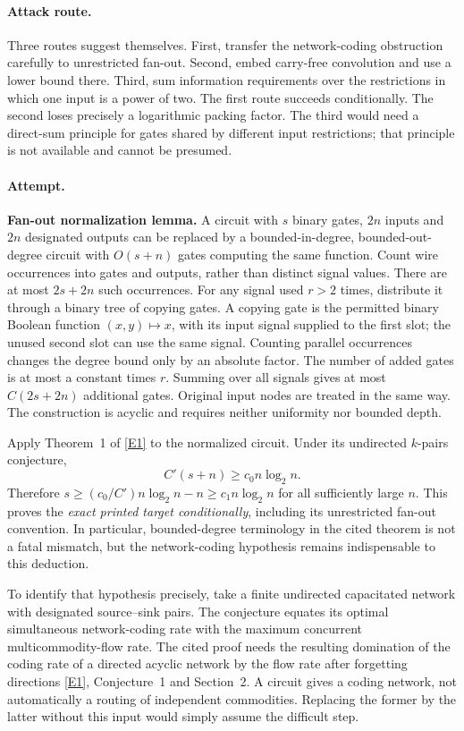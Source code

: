 \documentclass[11pt,a4paper]{article}
\newcommand{\eref}[2]{\hyperlink{extra:#1:#2}{[E#2]}}
\numberwithin{equation}{section}
\begin{document}
\paragraph{Attack route.}
Three routes suggest themselves. First, transfer the network-coding obstruction carefully to unrestricted fan-out. Second, embed carry-free convolution and use a lower bound there. Third, sum information requirements over the restrictions in which one input is a power of two. The first route succeeds conditionally. The second loses precisely a logarithmic packing factor. The third would need a direct-sum principle for gates shared by different input restrictions; that principle is not available and cannot be presumed.

\paragraph{Attempt.}
\textbf{Fan-out normalization lemma.} A circuit with $s$ binary gates, $2n$ inputs and $2n$ designated outputs can be replaced by a bounded-in-degree, bounded-out-degree circuit with $O(s+n)$ gates computing the same function.
Count wire occurrences into gates and outputs, rather than distinct signal values. There are at most $2s+2n$ such occurrences. For any signal used $r>2$ times, distribute it through a binary tree of copying gates. A copying gate is the permitted binary Boolean function $(x,y)\mapsto x$, with its input signal supplied to the first slot; the unused second slot can use the same signal. Counting parallel occurrences changes the degree bound only by an absolute factor. The number of added gates is at most a constant times $r$. Summing over all signals gives at most $C(2s+2n)$ additional gates. Original input nodes are treated in the same way. The construction is acyclic and requires neither uniformity nor bounded depth.

Apply Theorem~1 of \eref{statement}{1} to the normalized circuit. Under its undirected $k$-pairs conjecture,
\[
 C'(s+n)\ge c_0 n\log_2n.
\]
Therefore $s\ge(c_0/C')n\log_2n-n\ge c_1n\log_2n$ for all sufficiently large $n$. This proves the \emph{exact printed target conditionally}, including its unrestricted fan-out convention. In particular, bounded-degree terminology in the cited theorem is not a fatal mismatch, but the network-coding hypothesis remains indispensable to this deduction.

To identify that hypothesis precisely, take a finite undirected capacitated network with designated source--sink pairs. The conjecture equates its optimal simultaneous network-coding rate with the maximum concurrent multicommodity-flow rate. The cited proof needs the resulting domination of the coding rate of a directed acyclic network by the flow rate after forgetting directions \eref{statement}{1}, Conjecture~1 and Section~2. A circuit gives a coding network, not automatically a routing of independent commodities. Replacing the former by the latter without this input would simply assume the difficult step.
\end{document}
